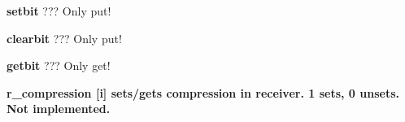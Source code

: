 \begin{DoxyItemize}
\item {\bfseries setbit} ??? Only put!
\end{DoxyItemize}


\begin{DoxyItemize}
\item {\bfseries clearbit } ??? Only put!
\end{DoxyItemize}


\begin{DoxyItemize}
\item {\bfseries getbit } ??? Only get!
\end{DoxyItemize}


\begin{DoxyItemize}
\item {\bfseries r\_\-compression \mbox{[}i\mbox{]} sets/gets compression in receiver. 1 sets, 0 unsets. Not implemented.} 
\end{DoxyItemize}